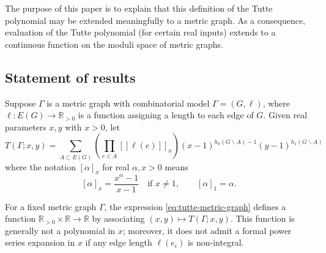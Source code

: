 \documentclass{amsart}
\theoremstyle{definition}
\newcommand{\RR}{\mathbb{R}}
\newcommand{\RRpos}{\RR_{>0}}
\newcommand{\fanalog}[2]{[\![#2]\!]_{#1}}
\newcommand{\analog}[2]{[#2]_{#1}}
\begin{document}
The purpose of this paper is to explain that this definition of the Tutte polynomial may be extended meaningfully to a metric graph.
As a consequence, evaluation of the Tutte polynomial (for certain real inputs) extends to a continuous function on the moduli space of metric graphs.

\subsection{Statement of results}
Suppose $\Gamma$ is a metric graph with combinatorial model $\Gamma = (G,\ell)$,
where $\ell : E(G) \to \RRpos$ is a function assigning a 
length to each edge of $G$.
Given real parameters $x,y$ with $x > 0$,
let 
\begin{equation}
\label{eq:tutte-metric-graph}
	T(\Gamma; x,y) = \sum_{A \subset E(G)} \left( \prod_{e \in A} \fanalog{x}{\ell(e)} \right)
	(x-1)^{h_0(G\backslash A) - 1}(y-1)^{h_1(G\backslash A)}
\end{equation}
where the notation $\analog{x}{\alpha}$ for real $\alpha, x > 0$ means
\begin{equation*}
\label{eq:q-analog-real}
	\analog{x}{\alpha} = \frac{x^\alpha - 1}{x-1}
	\quad\text{if } x \neq 1,
	\qquad 
	\analog{1}{\alpha} = \alpha.
\end{equation*}


For a fixed metric graph $\Gamma$,
the expression \eqref{eq:tutte-metric-graph} defines a function
$\RRpos\times \RR \to \RR$
by associating $(x,y) \mapsto T(\Gamma; x,y)$. 
This function is generally not a polynomial in $x$; %
moreover,  it does not admit a formal power series expansion in $x$ 
if any edge length $\ell(e_i)$ is non-integral.
\end{document}
